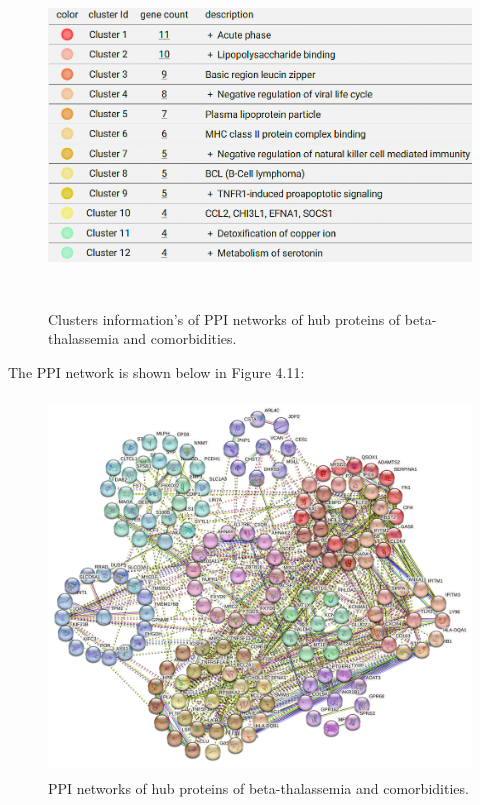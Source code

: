 \begin{figure}[H]
    \centering
    \includegraphics[height=9cm]{./fig/fig4_10.png}
    \centering
    \caption{Clusters information's of PPI networks of hub proteins of beta-thalassemia and comorbidities.}
    \label{PPI networks of hub proteins}
\end{figure}


The PPI network is shown below in Figure 4.11:

\begin{figure}[H]
    \centering
    \includegraphics[height=10cm]{./fig/fig4_11.png}
    \centering
    \caption{PPI networks of hub proteins of beta-thalassemia and comorbidities.}
    \label{PPI networks of hub proteins of beta-thalassemia and comorbidities.}
\end{figure}

